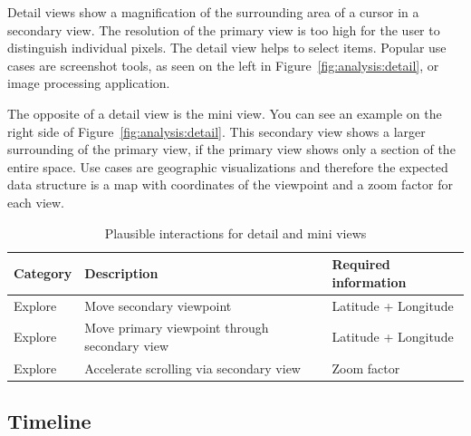 Detail views show a magnification of the surrounding area of a cursor in a secondary view.
The resolution of the primary view is too high for the user to distinguish individual pixels.
The detail view helps to select items.
Popular use cases are screenshot tools, as seen on the left in Figure~\ref{fig:analysis:detail}, or image processing application.

The opposite of a detail view is the mini view.
You can see an example on the right side of Figure~\ref{fig:analysis:detail}.
This secondary view shows a larger surrounding of the primary view, if the primary view shows only a section of the entire space.
Use cases are geographic visualizations and therefore the expected data structure is a map with coordinates of the viewpoint and a zoom factor for each view.

\begin{table}[H]
  \caption{Plausible interactions for detail and mini views}%
  \label{fig:analysis:detail:interactions}
  \begin{tabular*}{\textwidth}{lll}
    \bf Category & \bf Description & \bf Required information \\
    \hline
    Explore & Move secondary viewpoint & Latitude + Longitude \\
    Explore & Move primary viewpoint through secondary view & Latitude + Longitude \\
    Explore & Accelerate scrolling via secondary view & Zoom factor \\
  \end{tabular*}
\end{table}

\subsection{Timeline}

